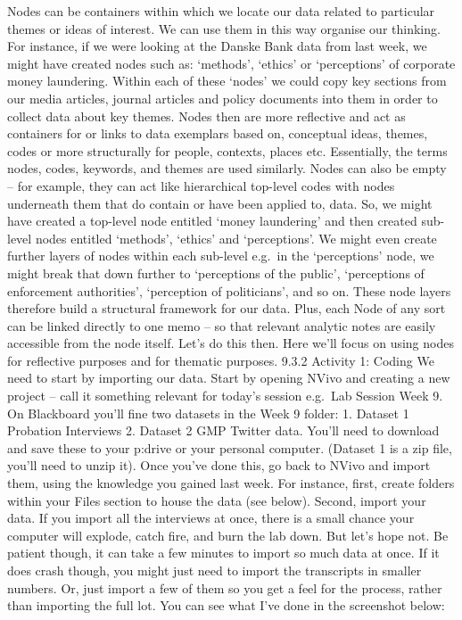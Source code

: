 \documentclass[
]{book}
\begin{document}
Nodes can be containers within which we locate our data related to particular themes or ideas of interest. We can use them in this way organise our thinking. For instance, if we were looking at the Danske Bank data from last week, we might have created nodes such as: `methods', `ethics' or `perceptions' of corporate money laundering. Within each of these `nodes' we could copy key sections from our media articles, journal articles and policy documents into them in order to collect data about key themes. Nodes then are more reflective and act as containers for or links to data exemplars based on, conceptual ideas, themes, codes or more structurally for people, contexts, places etc. Essentially, the terms nodes, codes, keywords, and themes are used similarly.
Nodes can also be empty -- for example, they can act like hierarchical top-level codes with nodes underneath them that do contain or have been applied to, data. So, we might have created a top-level node entitled `money laundering' and then created sub-level nodes entitled `methods', `ethics' and `perceptions'. We might even create further layers of nodes within each sub-level e.g.~in the `perceptions' node, we might break that down further to `perceptions of the public', `perceptions of enforcement authorities', `perception of politicians', and so on.
These node layers therefore build a structural framework for our data. Plus, each Node of any sort can be linked directly to one memo -- so that relevant analytic notes are easily accessible from the node itself.
Let's do this then. Here we'll focus on using nodes for reflective purposes and for thematic purposes.
9.3.2 Activity 1: Coding
We need to start by importing our data. Start by opening NVivo and creating a new project -- call it something relevant for today's session e.g.~Lab Session Week 9.
On Blackboard you'll fine two datasets in the Week 9 folder: 1. Dataset 1 Probation Interviews 2. Dataset 2 GMP Twitter data.
You'll need to download and save these to your p:drive or your personal computer. (Dataset 1 is a zip file, you'll need to unzip it). Once you've done this, go back to NVivo and import them, using the knowledge you gained last week. For instance, first, create folders within your Files section to house the data (see below). Second, import your data. If you import all the interviews at once, there is a small chance your computer will explode, catch fire, and burn the lab down. But let's hope not. Be patient though, it can take a few minutes to import so much data at once. If it does crash though, you might just need to import the transcripts in smaller numbers. Or, just import a few of them so you get a feel for the process, rather than importing the full lot. You can see what I've done in the screenshot below:
\end{document}
